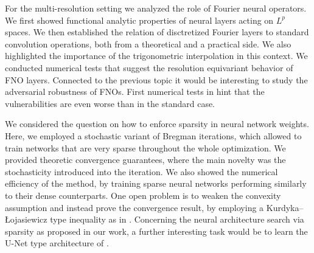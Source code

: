 For the multi-resolution setting we analyzed the role of Fourier neural operators. We first showed functional analytic properties of neural layers acting on $L^p$ spaces. We then established the relation of disctretized Fourier layers to standard convolution operations, both from a theoretical and a practical side. We also highlighted the importance of the trigonometric interpolation in this context. We conducted numerical tests that suggest the resolution equivariant behavior of FNO layers. Connected to the previous topic it would be interesting to study the adversarial robustness of FNOs. First numerical tests in \cite{kabri2022FNO} hint that the vulnerabilities are even worse than in the standard case.

We considered the question on how to enforce sparsity in neural network weights. Here, we employed a stochastic variant of Bregman iterations, which allowed to train networks that are very sparse throughout the whole optimization. We provided theoretic convergence guarantees, where the main novelty was the stochasticity introduced into the iteration. We also showed the numerical efficiency of the method, by training sparse neural networks performing similarly to their dense counterparts. One open problem is to weaken the convexity assumption and instead prove the convergence result, by employing a Kurdyka–\L{}ojasiewicz type inequality as in \cite{benning2018choose}. Concerning the neural architecture search via sparsity as proposed in our work, a further interesting task would be to learn the U-Net type architecture of \cite{ronneberger2015u}.
